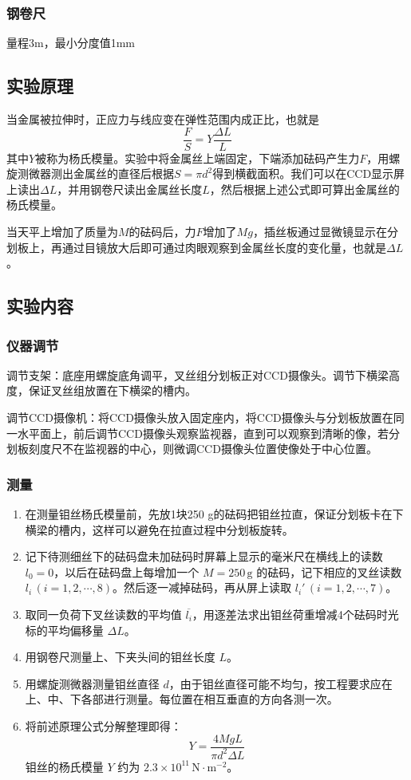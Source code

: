 \documentclass[zihao=5, UTF8]{article}
\theoremstyle{MyLineTheoremStyle} %
\theoremstyle{MyBlockTheoremStyle} %
\theoremstyle{MySubsubsectionStyle} %
\begin{document}
\subsubsection{钢卷尺}
量程3m，最小分度值1mm
\subsection{实验原理}
当金属被拉伸时，正应力与线应变在弹性范围内成正比，也就是
\begin{equation}
\frac{F}{S} = Y \frac{\Delta L}{L}
\end{equation}
其中$Y$被称为杨氏模量。实验中将金属丝上端固定，下端添加砝码产生力$F$，用螺旋测微器测出金属丝的直径后根据$S = \pi d^{2}$得到横截面积。我们可以在CCD显示屏上读出$ \Delta L $，并用钢卷尺读出金属丝长度$L$，然后根据上述公式即可算出金属丝的杨氏模量。

当天平上增加了质量为$M$的砝码后，力$F$增加了$Mg$，插丝板通过显微镜显示在分划板上，再通过目镜放大后即可通过肉眼观察到金属丝长度的变化量，也就是$\Delta L$。
\subsection{实验内容}
\subsubsection{仪器调节}
调节支架：底座用螺旋底角调平，叉丝组分划板正对CCD摄像头。调节下横梁高度，保证叉丝组放置在下横梁的槽内。

调节CCD摄像机：将CCD摄像头放入固定座内，将CCD摄像头与分划板放置在同一水平面上，前后调节CCD摄像头观察监视器，直到可以观察到清晰的像，若分划板刻度尺不在监视器的中心，则微调CCD摄像头位置使像处于中心位置。

\subsubsection{测量}
\begin{enumerate}
    \item 在测量钼丝杨氏模量前，先放1块250 g的砝码把钼丝拉直，保证分划板卡在下横梁的槽内，这样可以避免在拉直过程中分划板旋转。
    \item 记下待测细丝下的砝码盘未加砝码时屏幕上显示的毫米尺在横线上的读数 $l_0=0$，以后在砝码盘上每增加一个 $M=250 \, \text{g}$ 的砝码，记下相应的叉丝读数 $l_i \, (i=1,2,\cdots,8)$。然后逐一减掉砝码，再从屏上读取 $l_i' \, (i=1,2,\cdots,7)$。
    \item 取同一负荷下叉丝读数的平均值 $\overline{l_i}$，用逐差法求出钼丝荷重增减4个砝码时光标的平均偏移量 $\Delta L$。
    \item 用钢卷尺测量上、下夹头间的钼丝长度 $L$。
    \item 用螺旋测微器测量钼丝直径 $d$，由于钼丝直径可能不均匀，按工程要求应在上、中、下各部进行测量。每位置在相互垂直的方向各测一次。
    \item 将前述原理公式分解整理即得：
    \begin{equation}
        Y = \frac{4MgL}{\pi d^2 \Delta L}
    \end{equation}
        钼丝的杨氏模量 $Y$ 约为 $2.3 \times 10^{11} \, \text{N} \cdot \text{m}^{-2}$。
\end{enumerate}
\end{document}
